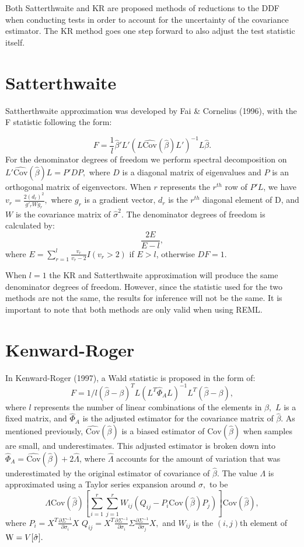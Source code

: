 \documentclass[12pt, twoside]{amherstthesis}
\begin{document}
Both Satterthwaite and KR are proposed methods of reductions to the DDF when conducting tests in order to account for the uncertainty of the covariance estimator. The KR method goes one step forward to also adjust the test statistic itself.

\hypertarget{satterthwaite}{%
\section{Satterthwaite}\label{satterthwaite}}

Sattherthwaite approximation was developed by Fai \& Cornelius (1996), with the F statistic following the form:

\[F = \frac{1}{l}\hat\beta'L'(L\widehat {\text{Cov}}(\hat\beta) L')^{-1}L\hat\beta.\] For the denominator degrees of freedom we perform spectral decomposition on \(L'\widehat {\text{Cov}}(\hat\beta) L=P'DP,\) where \(D\) is a diagonal matrix of eigenvalues and \(P\) is an orthogonal matrix of eigenvectors. When \(r\) represents the \(r^{th}\) row of \(P'L\), we have \(v_r = \frac{2(d_r)^2}{g'_rWg_r},\) where \(g_r\) is a gradient vector, \(d_r\) is the \(r^{th}\) diagonal element of D, and \(W\) is the covariance matrix of \(\hat\sigma^2.\) The denominator degrees of freedom is calculated by:
\[\frac{2E}{E-l},\] where \(E = \sum_{r = 1}^{l} \frac{v_r}{v_r-2}I(v_r>2)\) if \(E >l\), otherwise \(DF = 1.\)

When \(l =1\) the KR and Satterthwaite approximation will produce the same denominator degrees of freedom. However, since the statistic used for the two methods are not the same, the results for inference will not be the same. It is important to note that both methods are only valid when using REML.

\hypertarget{kenward-roger}{%
\section{Kenward-Roger}\label{kenward-roger}}

In Kenward-Roger (1997), a Wald statistic is proposed in the form of:
\[F = 1/l(\hat\beta-\beta)^TL(L^T\hat\Phi_A L)^{-1}L^T(\hat\beta-\beta),\] where \(l\) represents the number of linear combinations of the elements in \(\beta,\) \(L\) is a fixed matrix, and \(\hat\Phi_A\) is the adjusted estimator for the covariance matrix of \(\hat\beta\). As mentioned previously, \(\widehat {\text{Cov}}(\hat\beta)\) is a biased estimator of \(\text{Cov}(\hat\beta)\) when samples are small, and underestimates. This adjusted estimator is broken down into \(\hat\Phi_A = \widehat {\text {Cov}}(\hat\beta) + 2\hat\Lambda\), where \(\hat\Lambda\) accounts for the amount of variation that was underestimated by the original estimator of covariance of \(\hat\beta\). The value \(\Lambda\) is approximated using a Taylor series expansion around \(\sigma,\) to be \[\Lambda\text{Cov}(\hat\beta)[\sum_{i=1}^{r}\sum_{j=1}^{r}W_{ij}(Q_{ij}-P_i\text{Cov}(\hat\beta)P_j)]\text{Cov}(\hat\beta),\] where
\(P_i = X^T\frac{\partial\Sigma^{-1}}{\partial\sigma_i}X\)
\(Q_{ij} = X^T \frac{\partial\Sigma^{-1}}{\partial\sigma_i}\Sigma\frac{\partial\Sigma^{-1}}{\partial\sigma_j}X,\) and \(W_{ij}\) is the \((i,j)\)th element of \(\text W = V[\hat\sigma].\)
\end{document}
